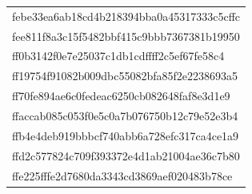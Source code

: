 \begin{tabular}{l}
febe33ea6ab18cd4b218394bba0a45317333c5cffc \\
fee811f8a3c15f5482bbf415c9bbb7367381b19950 \\
ff0b3142f0e7e25037c1db1cdffff2c5ef67fe58c4 \\
ff19754f91082b009dbc55082bfa85f2e2238693a5 \\
ff70fe894ae6c0fedeac6250cb082648faf8e3d1e9 \\
ffaccab085c053f0e5c0a7b076750b12c79e52e3b4 \\
ffb4e4deb919bbbcf740abb6a728efc317ca4ce1a9 \\
ffd2c577824c709f393372e4d1ab21004ae36c7b80 \\
ffe225fffe2d7680da3343cd3869aef020483b78ce \\
\bottomrule
\end{tabular}
